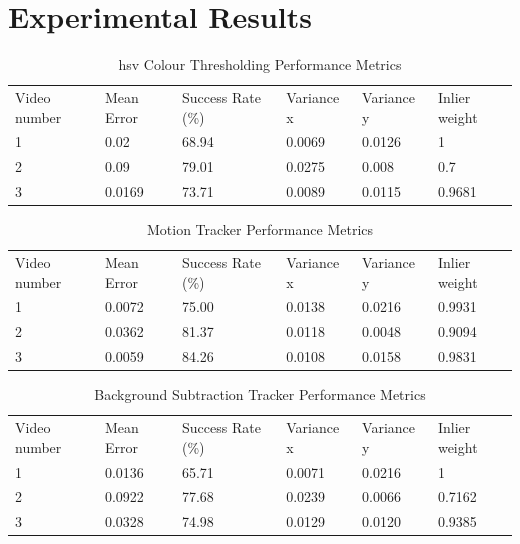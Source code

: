 \documentclass[12pt,a4paper]{article}
\begin{document}
\newpage
\section{Experimental Results}

\begin{table}[H]
\centering
\caption{\acs{hsv} Colour Thresholding Performance Metrics}
\begin{tabular}{p{2cm} p{2cm} p{1.7cm} p{1.75cm} p{1.75cm} p{1.75cm}}
\toprule
Video number & Mean Error & Success Rate (\%) & Variance x & Variance y & Inlier weight \\
1 & 0.02 & 68.94 & 0.0069 & 0.0126 & 1 \\
2 & 0.09 & 79.01 & 0.0275 & 0.008 & 0.7 \\
3 & 0.0169 & 73.71 & 0.0089 & 0.0115 & 0.9681 \\
\bottomrule
\end{tabular}
\end{table}

\begin{table}[H]
\centering
\caption{Motion Tracker Performance Metrics}
\begin{tabular}{p{2cm} p{2cm} p{1.7cm} p{1.75cm} p{1.75cm} p{1.75cm}}
\toprule
Video number & Mean Error & Success Rate (\%) & Variance x & Variance y & Inlier weight \\
1 & 0.0072 & 75.00 & 0.0138 & 0.0216 & 0.9931 \\
2 & 0.0362 & 81.37 & 0.0118 & 0.0048 & 0.9094 \\
3 & 0.0059 & 84.26 & 0.0108 & 0.0158 & 0.9831 \\
\bottomrule
\end{tabular}
\end{table}

\begin{table}[H]
\centering
\caption{Background Subtraction Tracker Performance Metrics}
\begin{tabular}{p{2cm} p{2cm} p{1.7cm} p{1.75cm} p{1.75cm} p{1.75cm}}
\toprule
Video number & Mean Error & Success Rate (\%) & Variance x & Variance y & Inlier weight \\
1 & 0.0136 & 65.71 & 0.0071 & 0.0216 & 1 \\
2 & 0.0922 & 77.68 & 0.0239 & 0.0066 & 0.7162 \\
3 & 0.0328 & 74.98 & 0.0129 & 0.0120 & 0.9385 \\
\bottomrule
\end{tabular}
\end{table}
\end{document}
